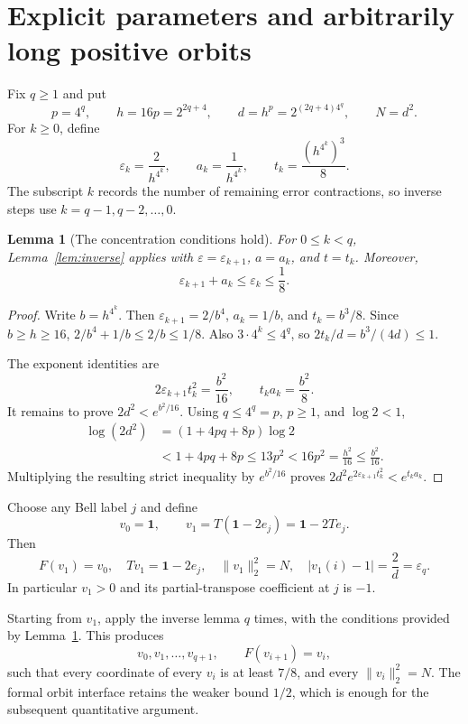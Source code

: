 \documentclass[11pt]{article}
\newtheorem{lemma}{Lemma}
\newcommand{\one}{\mathbf1}
\begin{document}
\section{Explicit parameters and arbitrarily long positive orbits}\label{sec:orbits}
Fix $q\ge1$ and put
\begin{equation}\label{eq:params}
p=4^q,\qquad h=16p=2^{2q+4},\qquad d=h^p=2^{(2q+4)4^q},\qquad N=d^2.
\end{equation}
For $k\ge0$, define
\begin{equation}\label{eq:errors}
\varepsilon_k=\frac2{h^{4^k}},\qquad
a_k=\frac1{h^{4^k}},\qquad
t_k=\frac{(h^{4^k})^3}{8}.
\end{equation}
The subscript $k$ records the number of remaining error contractions, so
inverse steps use $k=q-1,q-2,\ldots,0$.

\begin{lemma}[The concentration conditions hold]\label{lem:parameters}
For $0\le k<q$, Lemma~\ref{lem:inverse} applies with
$\varepsilon=\varepsilon_{k+1}$, $a=a_k$, and $t=t_k$.
Moreover,
\[
\varepsilon_{k+1}+a_k\le\varepsilon_k\le\frac18.
\]
\end{lemma}

\begin{proof}
Write $b=h^{4^k}$. Then $\varepsilon_{k+1}=2/b^4$,
$a_k=1/b$, and $t_k=b^3/8$. Since $b\ge h\ge16$,
$2/b^4+1/b\le2/b\le1/8$. Also $3\cdot4^k\le4^q$, so
$2t_k/d=b^3/(4d)\le1$.

The exponent identities are
\[
2\varepsilon_{k+1}t_k^2=\frac{b^2}{16},\qquad
t_ka_k=\frac{b^2}{8}.
\]
It remains to prove $2d^2<e^{b^2/16}$. Using $q\le4^q=p$,
$p\ge1$, and $\log2<1$,
\begin{align*}
\log(2d^2)
&=(1+4pq+8p)\log2\\
&<1+4pq+8p\le13p^2<16p^2
=\frac{h^2}{16}\le\frac{b^2}{16}.
\end{align*}
Multiplying the resulting strict inequality by $e^{b^2/16}$ proves
$2d^2e^{2\varepsilon_{k+1}t_k^2}<e^{t_ka_k}$.
\end{proof}

Choose any Bell label $j$ and define
\begin{equation}\label{eq:initial}
v_0=\one,\qquad v_1=T(\one-2e_j)=\one-2Te_j.
\end{equation}
Then
\[
F(v_1)=v_0,\quad Tv_1=\one-2e_j,\quad
\|v_1\|_2^2=N,\quad |v_1(i)-1|=\frac2d=\varepsilon_q.
\]
In particular $v_1>0$ and its partial-transpose coefficient at $j$ is $-1$.

Starting from $v_1$, apply the inverse lemma $q$ times, with the conditions
provided by Lemma~\ref{lem:parameters}. This produces
\begin{equation}\label{eq:orbit}
v_0,v_1,\ldots,v_{q+1},\qquad
F(v_{i+1})=v_i,
\end{equation}
such that every coordinate of every $v_i$ is at least $7/8$, and every
$\|v_i\|_2^2=N$. The formal orbit interface retains the weaker bound $1/2$,
which is enough for the subsequent quantitative argument.
\end{document}
